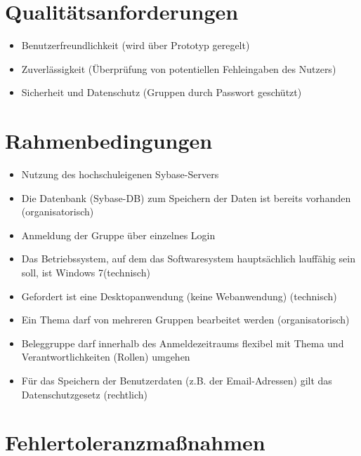 \documentclass{article}
\begin{document}

\section{Qualitätsanforderungen}
\begin{itemize}
\item Benutzerfreundlichkeit (wird über Prototyp geregelt)
\item Zuverlässigkeit (Überprüfung von potentiellen Fehleingaben des Nutzers)
\item Sicherheit und Datenschutz (Gruppen durch Passwort geschützt)
\end{itemize}

\section{Rahmenbedingungen}
\begin{itemize}
\item Nutzung des hochschuleigenen Sybase-Servers
\item Die Datenbank (Sybase-DB) zum Speichern der Daten ist bereits vorhanden
(organisatorisch)
\item Anmeldung der Gruppe über einzelnes Login
\item Das Betriebssystem, auf dem das Softwaresystem hauptsächlich lauffähig
sein soll, ist Windows 7(technisch)
\item Gefordert ist eine Desktopanwendung (keine Webanwendung) (technisch)
\item Ein Thema darf von mehreren Gruppen bearbeitet werden (organisatorisch)
\item Beleggruppe darf innerhalb des Anmeldezeitraums flexibel mit Thema und Verantwortlichkeiten (Rollen) umgehen
\item Für das Speichern der Benutzerdaten (z.B. der Email-Adressen) gilt das
Datenschutzgesetz (rechtlich)
\end{itemize}

\section{Fehlertoleranzmaßnahmen}
\end{document}
